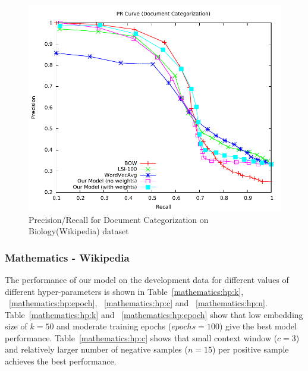 \begin{figure}[tb]
\centering
        \includegraphics[width=0.8\columnwidth]{figs/pr/biology-cs-scala.pdf}
        \vskip -4mm
    \caption{ Precision/Recall for Document Categorization on Biology(Wikipedia) dataset}
    \label{fig:pr:biology:cs} 
\end{figure}

\subsubsection{Mathematics - Wikipedia}
The performance of our model on the development data for different values of different hyper-parameters is shown in Table~\ref{mathematics:hp:k}, ~\ref{mathematics:hp:epoch}, ~\ref{mathematics:hp:c} and ~\ref{mathematics:hp:n}. Table~\ref{mathematics:hp:k} and ~\ref{mathematics:hp:epoch} show that low embedding size of $k = 50$ and moderate training epochs ($epochs = 100$) give the best model performance. 
Table~\ref{mathematics:hp:c} shows that small context window ($c = 3$) and relatively larger number of negative samples ($n = 15$) per positive sample achieves the best performance.

